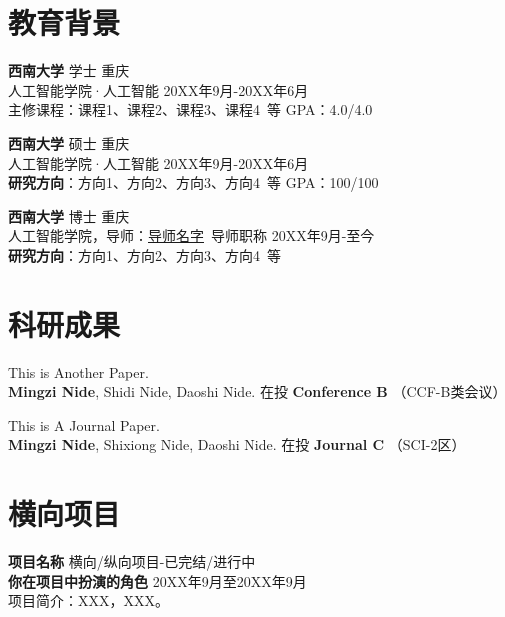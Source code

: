     \section{\makebox[\widthof{\faGraduationCap}][c]{\color{SWU_Blue}{\faGraduationCap}}\quad 教育背景}

    {\large \textbf{西南大学}}  学士 \hfill {重庆} \\
    {{人工智能学院}}·人工智能 \hfill {20XX年9月-20XX年6月} \\
    {主修课程}：课程1、课程2、课程3、课程4\ 等
    \hfill {GPA}：4.0/4.0

    \vspace{0.5em}
    {\large \textbf{西南大学}}  硕士 \hfill {重庆} \\
    {{人工智能学院}}·人工智能 \hfill {20XX年9月-20XX年6月} \\
    \textbf{研究方向}：方向1、方向2、方向3、方向4\ 等
    \hfill {GPA}：100/100

    \vspace{0.5em}
    {\large \textbf{西南大学}}  博士 \hfill {重庆} \\
    {{人工智能学院}}，导师：\href{导师的个人主页.site}{导师名字}\ 导师职称 \hfill {20XX年9月-至今} \\
    \textbf{研究方向}：方向1、方向2、方向3、方向4\ 等


    \section{\makebox[\widthof{\faGraduationCap}][c]{\color{SWU_Blue}{\faFlask}}\quad 科研成果}
    
    \vspace{0.5em}
    This is Another Paper. \\
    \textbf{Mingzi Nide}, Shidi Nide, Daoshi Nide. \hfill 
    在投 \textbf{Conference B} （CCF-B类会议）

    \vspace{0.5em}
    This is A Journal Paper.\\
    \textbf{Mingzi Nide}, Shixiong Nide, Daoshi Nide. \hfill 
    在投 \textbf{Journal C} （SCI-2区）


    \section{\makebox[\widthof{\faChalkboardTeacher}][c]{\color{SWU_Blue}{\faChalkboardTeacher}}\quad 横向项目}
    \vspace{0.5em}
    {\large{\textbf{项目名称}}} \hfill {横向/纵向项目-已完结/进行中}\\
    \textbf{你在项目中扮演的角色} \hfill 20XX年9月至20XX年9月\\
    项目简介：XXX，XXX。
    

